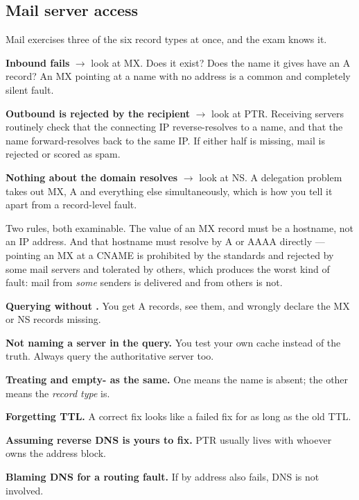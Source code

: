 \subsection{Mail server access}

Mail exercises three of the six record types at once, and the exam knows it.

\begin{tight}
  \item \textbf{Inbound fails} $\rightarrow$ look at MX. Does it exist? Does the
        name it gives have an A record? An MX pointing at a name with no address
        is a common and completely silent fault.
  \item \textbf{Outbound is rejected by the recipient} $\rightarrow$ look at PTR.
        Receiving servers routinely check that the connecting IP reverse-resolves
        to a name, and that the name forward-resolves back to the same IP. If
        either half is missing, mail is rejected or scored as spam.
  \item \textbf{Nothing about the domain resolves} $\rightarrow$ look at NS. A
        delegation problem takes out MX, A and everything else simultaneously,
        which is how you tell it apart from a record-level fault.
\end{tight}

\begin{alertbox}
Two rules, both examinable. The value of an MX record must be a hostname, not an
IP address. And that hostname must resolve by A or AAAA directly --- pointing an
MX at a CNAME is prohibited by the standards and rejected by some mail servers
and tolerated by others, which produces the worst kind of fault: mail from
\emph{some} senders is delivered and from others is not.
\end{alertbox}

\begin{pitfall}
\begin{tight}
  \item \textbf{Querying without .} You get A records, see them, and
        wrongly declare the MX or NS records missing.
  \item \textbf{Not naming a server in the query.} You test your own cache
        instead of the truth. Always query the authoritative server too.
  \item \textbf{Treating  and empty- as the same.} One
        means the name is absent; the other means the \emph{record type} is.
  \item \textbf{Forgetting TTL.} A correct fix looks like a failed fix for as long
        as the old TTL.
  \item \textbf{Assuming reverse DNS is yours to fix.} PTR usually lives with
        whoever owns the address block.
  \item \textbf{Blaming DNS for a routing fault.} If  by address also
        fails, DNS is not involved.
\end{tight}
\end{pitfall}

